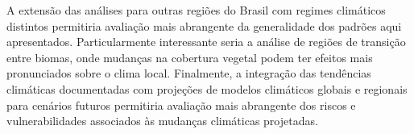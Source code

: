 A extensão das análises para outras regiões do Brasil com regimes climáticos distintos permitiria avaliação mais abrangente da generalidade dos padrões aqui apresentados. Particularmente interessante seria a análise de regiões de transição entre biomas, onde mudanças na cobertura vegetal podem ter efeitos mais pronunciados sobre o clima local.
Finalmente, a integração das tendências climáticas documentadas com projeções de modelos climáticos globais e regionais para cenários futuros permitiria avaliação mais abrangente dos riscos e vulnerabilidades associados às mudanças climáticas projetadas.
